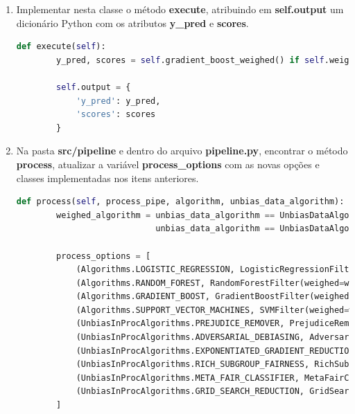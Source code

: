 \documentclass[Portugues,Final]{ic-tese-v3}
\begin{document}
\begin{enumerate}
\begin{lstlisting}[language=Python, label=cod:BaseFilter]
class GradientBoostFilter(BaseFilter):
    weighed = False

    def __init__(self, weighed=False):
        self.weighed = weighed
\end{lstlisting}

\item Implementar nesta classe o método \textbf{execute}, atribuindo em \textbf{self.output} um dicionário Python com os atributos \textbf{y\_pred} e \textbf{scores}.

\begin{lstlisting}[language=Python, label=cod:FilterExecute]
    def execute(self):
        y_pred, scores = self.gradient_boost_weighed() if self.weighed else self.gradient_boost()

        self.output = {
            'y_pred': y_pred,
            'scores': scores
        }
\end{lstlisting}

\item Na pasta \textbf{src/pipeline} e dentro do arquivo \textbf{pipeline.py}, encontrar o método \textbf{process}, atualizar a variável \textbf{process\_options} com as novas opções e classes implementadas nos itens anteriores.

\begin{lstlisting}[language=Python, label=cod:ProcessAlgorithm]
    def process(self, process_pipe, algorithm, unbias_data_algorithm):
        weighed_algorithm = unbias_data_algorithm == UnbiasDataAlgorithms.REWEIGHING or \
                            unbias_data_algorithm == UnbiasDataAlgorithms.LEARNING_FAIR_REPRESENTATIONS

        process_options = [
            (Algorithms.LOGISTIC_REGRESSION, LogisticRegressionFilter(weighed=weighed_algorithm)),
            (Algorithms.RANDOM_FOREST, RandomForestFilter(weighed=weighed_algorithm)),
            (Algorithms.GRADIENT_BOOST, GradientBoostFilter(weighed=weighed_algorithm)),
            (Algorithms.SUPPORT_VECTOR_MACHINES, SVMFilter(weighed=weighed_algorithm)),
            (UnbiasInProcAlgorithms.PREJUDICE_REMOVER, PrejudiceRemoverFilter()),
            (UnbiasInProcAlgorithms.ADVERSARIAL_DEBIASING, AdversarialDebiasingFilter()),
            (UnbiasInProcAlgorithms.EXPONENTIATED_GRADIENT_REDUCTION, ExponentiatedGradientReductionFilter(algorithm=Algorithms.GRADIENT_BOOST)),
            (UnbiasInProcAlgorithms.RICH_SUBGROUP_FAIRNESS, RichSubgroupFairnessFilter(algorithm=Algorithms.DECISION_TREE)),
            (UnbiasInProcAlgorithms.META_FAIR_CLASSIFIER, MetaFairClassifierFilter()),
            (UnbiasInProcAlgorithms.GRID_SEARCH_REDUCTION, GridSearchReductionFilter(algorithm=Algorithms.RANDOM_FOREST))
        ]


\end{lstlisting}
\end{enumerate}
\end{document}
